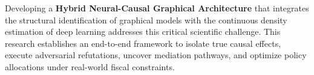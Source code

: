 Developing a \textbf{Hybrid Neural-Causal Graphical Architecture} that integrates the structural identification of graphical models with the continuous density estimation of deep learning addresses this critical scientific challenge. This research establishes an end-to-end framework to isolate true causal effects, execute adversarial refutations, uncover mediation pathways, and optimize policy allocations under real-world fiscal constraints.
